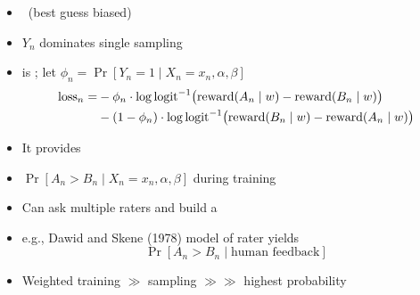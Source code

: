\documentclass[9pt]{report}
\begin{document}
\begin{itemize}
\item {} \ (best guess biased)
\item {} $Y_n$ dominates single sampling
\item {} is ; let $\phi_n = \Pr[Y_n = 1
  \mid X_n = x_n, \alpha, \beta]$
\begin{align*}
  \textrm{loss}_n = &- \phi_n \cdot \log  \textrm{logit}^{-1}\!\left(\strut \textrm{reward}(A_n \mid w) -                 \textrm{reward}(B_n \mid w)\right) 
  \\
  &- (1 - \phi_n) \cdot \log \textrm{logit}^{-1}\!\left(\strut \textrm{reward}(B_n \mid w) -                 \textrm{reward}(A_n \mid w)\right) 
\end{align*}
\item {}  It provides 
\end{itemize}

\begin{itemize}
\item {} $\Pr[A_n > B_n \mid X_n = x_n, \alpha,
  \beta]$ during training
\item Can ask multiple raters and build a 
\item e.g., Dawid and Skene (1978) model of rater  yields
$$\Pr\left[A_n > B_n \mid \textrm{human feedback}\right]$$
\item Weighted training $\gg$ sampling $\gg\!\gg$ highest probability
\end{itemize}
\end{document}
